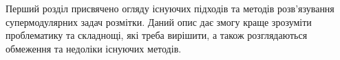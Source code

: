 Перший розділ присвячено огляду існуючих підходів та методів
розв'язування супермодулярних задач розмітки. Даний опис дає змогу
краще зрозуміти проблематику та складнощі, які треба вирішити, а також
розглядаються обмеження та недоліки існуючих методів.
